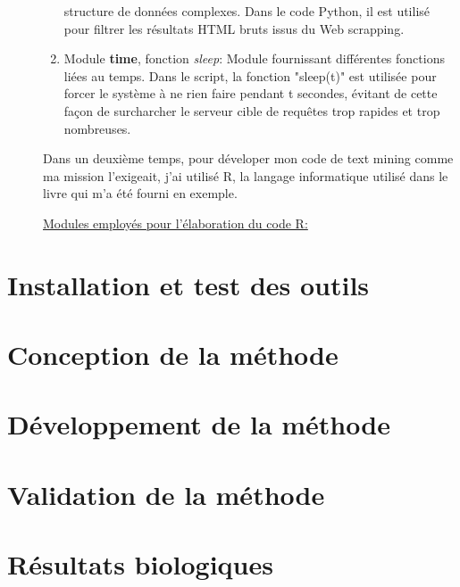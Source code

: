 \documentclass{book}
\begin{document}
\begin{description}
\begin{enumerate}
                  structure de données complexes. Dans le code Python, il est utilisé pour
                  filtrer les résultats HTML bruts issus du Web scrapping.
                  \vspace{\baselineskip}
            \item Module \textbf{time}, fonction \textit{sleep}: Module
                  fournissant différentes fonctions liées au temps. Dans le script, la fonction
                  "sleep(t)" est utilisée pour forcer le système à ne rien faire pendant t
                  secondes, évitant de cette façon de surcharcher le serveur cible de requêtes
                  trop rapides et trop nombreuses.
        \end{enumerate}

        \vspace{\baselineskip}
        \noindent
        Dans un deuxième temps, pour déveloper mon code de text mining comme ma
        mission l'exigeait, j'ai utilisé R, la langage informatique utilisé dans le
        livre qui m'a été fourni en exemple.

        \vspace{\baselineskip}
        \noindent
        \underline{Modules employés pour l'élaboration du code R:}

\end{description}
\noindent

\section{Installation et test des outils}

\section{Conception de la méthode}

\section{Développement de la méthode}

\section{Validation de la méthode}

\section{Résultats biologiques}
\end{document}

